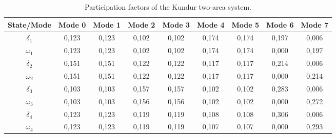 \begin{table}[H]
\centering
\caption{Participation factors of the Kundur two-area system.}
\label{tab:pfactors_kundur}
\renewcommand{\arraystretch}{1.2}
\small
\begin{tabular}{|c|cccccccc|}
\hline
\textbf{State/Mode} & \textbf{Mode 0} & \textbf{Mode 1} & \textbf{Mode 2} & \textbf{Mode 3} & \textbf{Mode 4} & \textbf{Mode 5} & \textbf{Mode 6} & \textbf{Mode 7} \\ 
\hline
$\delta_1$ & \cellcolor{g2}0,123 & \cellcolor{g2}0,123 & \cellcolor{g1}0,102 & \cellcolor{g1}0,102 & \cellcolor{g3}0,174 & \cellcolor{g3}0,174 & \cellcolor{g3}0,197 & 0,006 \\

$\omega_1$ & \cellcolor{g2}0,123 & \cellcolor{g2}0,123 & \cellcolor{g1}0,102 & \cellcolor{g1}0,102 & \cellcolor{g3}0,174 & \cellcolor{g3}0,174 & 0,000 & \cellcolor{g3}0,197 \\

$\delta_2$ & \cellcolor{g3}0,151 & \cellcolor{g3}0,151 & \cellcolor{g2}0,122 & \cellcolor{g2}0,122 & \cellcolor{g2}0,117 & \cellcolor{g2}0,117 & \cellcolor{g4}0,214 & 0,006 \\

$\omega_2$ & \cellcolor{g3}0,151 & \cellcolor{g3}0,151 & \cellcolor{g2}0,122 & \cellcolor{g2}0,122 & \cellcolor{g2}0,117 & \cellcolor{g2}0,117 & 0,000 & \cellcolor{g4}0,214 \\

$\delta_3$ & \cellcolor{g2}0,103 & \cellcolor{g2}0,103 & \cellcolor{g3}0,157 & \cellcolor{g3}0,157 & \cellcolor{g2}0,102 & \cellcolor{g2}0,102 & \cellcolor{g4}0,283 & 0,006 \\

$\omega_3$ & \cellcolor{g2}0,103 & \cellcolor{g2}0,103 & \cellcolor{g3}0,156 & \cellcolor{g3}0,156 & \cellcolor{g2}0,102 & \cellcolor{g2}0,102 & 0,000 & \cellcolor{g4}0,272 \\

$\delta_4$ & \cellcolor{g2}0,123 & \cellcolor{g2}0,123 & \cellcolor{g2}0,119 & \cellcolor{g2}0,119 & \cellcolor{g2}0,108 & \cellcolor{g2}0,108 & \cellcolor{g4}0,306 & 0,006 \\

$\omega_4$ & \cellcolor{g2}0,123 & \cellcolor{g2}0,123 & \cellcolor{g2}0,119 & \cellcolor{g2}0,119 & \cellcolor{g2}0,107 & \cellcolor{g2}0,107 & 0,000 & \cellcolor{g4}0,293 \\
\hline
\end{tabular}
\end{table}


